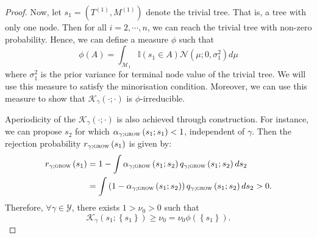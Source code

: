 \documentclass[
12pt]{article}
\begin{document}
\begin{proof}
	Now, let $s_1 = \left(T^{(1)},M^{(1)}\right)$ denote the trivial tree. That is, a tree with only one node. Then for all $i=2,\cdots, n$, we can reach the trivial tree with non-zero probability. Hence, we can define a measure $\phi$ such that
	\begin{equation*}
		\phi(A) = \int_{\mathcal{M}_1}\mathbb{I}\left(s_1\in A\right)\mathcal{N}\left(\mu;0,\sigma_1^2\right)d\mu
	\end{equation*}
	where $\sigma^2_1$ is the prior variance for terminal node value of the trivial tree. We will use this measure to satisfy the minorisation condition. Moreover, we can use this measure to show that $\mathcal{K}_{\gamma}(\cdot;\cdot)$ is $\phi$-irreducible. 
	
	Aperiodicity of the $\mathcal{K}_{\gamma}(\cdot;\cdot)$ is also achieved through construction. For instance, we can propose $s_2$ for which $\alpha_{\gamma;\textsc{grow}}\left(s_1; s_1\right) < 1$, independent of $\gamma$. Then the rejection probability $r_{\gamma;\textsc{grow}}\left(s_1\right)$ is given by:
	\begin{align*}
		r_{\gamma;\textsc{grow}}\left(s_1\right)
		&=1-\int \alpha_{\gamma;\textsc{grow}}\left(s_1; s_2\right)q_{\gamma;\textsc{grow}}\left(s_1; s_2\right) ds_2\\
		&=\int\left(1 - \alpha_{\gamma;\textsc{grow}}\left(s_1; s_2\right)\right) q_{\gamma;\textsc{grow}}\left(s_1; s_2\right) ds_2 > 0.
	\end{align*}
	Therefore, $\forall\gamma\in\mathcal{Y}$, there exists $1>\nu_0 >0$ such that
	\begin{equation}\label{eq:stay:trivial}
		\mathcal{K}_{\gamma}\left(s_1;\left\{s_1\right\}\right) \ge \nu_0 = \nu_0 \phi\left(\left\{s_1\right\}\right).
	\end{equation}
	

\end{proof}
\end{document}
